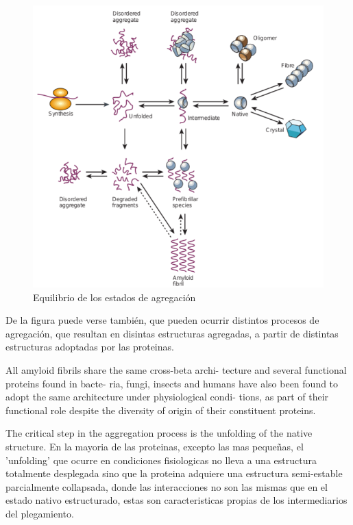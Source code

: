 \begin{figure}[h!,centered]
\includegraphics[width=\textwidth]{img/aggregationDiagram.png} 
\caption{Equilibrio de los estados de agregación} \label{aggregationDiagram}
\end{figure}



De la figura puede verse también, que pueden ocurrir distintos procesos de agregación, que resultan en disintas estructuras agregadas, a partir de distintas estructuras adoptadas por las proteinas.



All amyloid fibrils share the same cross-beta archi-
tecture and several functional proteins found in bacte-
ria, fungi, insects and humans have also been found to
adopt the same architecture under physiological condi-
tions, as part of their functional role despite the diversity of origin of their
constituent proteins.













The critical step in the aggregation process is the unfolding of the native structure. 
En la mayoria de las proteinas, excepto las mas pequeñas, el 'unfolding' que ocurre en condiciones fisiologicas no lleva a una estructura totalmente desplegada sino que la proteina adquiere una estructura semi-estable parcialmente collapsada,
donde las interacciones no son las mismas que en el estado nativo estructurado, estas son caracteristicas propias de los intermediarios del plegamiento.

